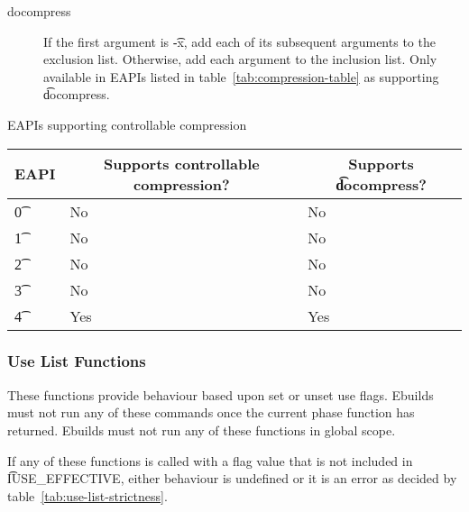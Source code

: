 \begin{description}
\item[docompress] If the first argument is \t{-x}, add each of its subsequent arguments to the
exclusion list. Otherwise, add each argument to the inclusion list. Only available in EAPIs listed
in table~\ref{tab:compression-table} as supporting \t{docompress}.
\end{description}

\begin{centertable}{EAPIs supporting controllable compression} \label{tab:compression-table}
    \begin{tabular}{ l l l }
        \toprule
            \multicolumn{1}{c}{\textbf{EAPI}} &
            \multicolumn{1}{c}{\textbf{Supports controllable compression?}} &
            \multicolumn{1}{c}{\textbf{Supports \t{docompress}?}} \\
            \midrule
    \t{0} & No & No \\
    \t{1} & No & No \\
    \t{2} & No & No \\
    \t{3} & No & No \\
    \t{4} & Yes & Yes \\
    \bottomrule
    \end{tabular}
\end{centertable}

\subsubsection{Use List Functions}
These functions provide behaviour based upon set or unset use flags. Ebuilds must not run any of
these commands once the current phase function has returned. Ebuilds must not run any of these
functions in global scope.

If any of these functions is called with a flag value that is not included in \t{IUSE\_EFFECTIVE},
either behaviour is undefined or it is an error as decided by table~\ref{tab:use-list-strictness}.

